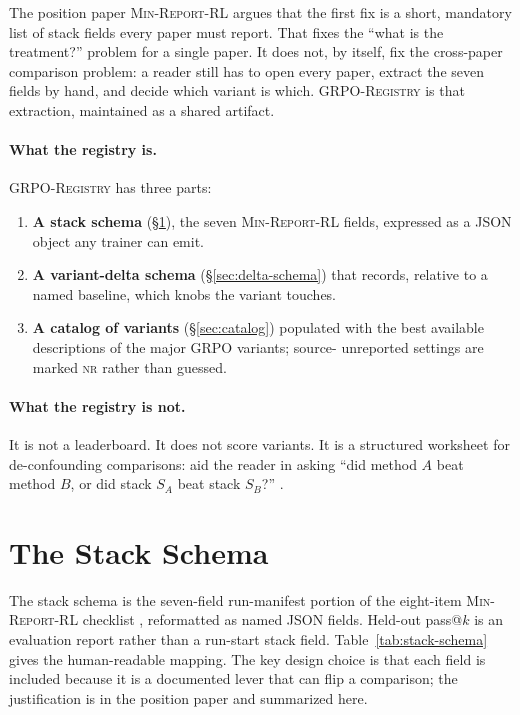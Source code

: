\documentclass[11pt]{article}
\newcommand{\nr}{\textsc{nr}}
\newcommand{\minreport}{\textsc{Min-Report-RL}}
\newcommand{\grpo}{\textsc{GRPO}}
\newcommand{\grpoReg}{\textsc{GRPO-Registry}}
\begin{document}
The position paper \minreport{} \cite{minreportrl2026} argues that the first
fix is a short, mandatory list of stack fields every paper must report. That
fixes the ``what is the treatment?'' problem for a single paper. It does not,
by itself, fix the cross-paper comparison problem: a reader still has to open
every paper, extract the seven fields by hand, and decide which variant is
which. \grpoReg{} is that extraction, maintained as a shared artifact.

\paragraph{What the registry is.} \grpoReg{} has three parts:
\begin{enumerate}[leftmargin=1.6em, itemsep=2pt]
  \item \textbf{A stack schema} (\S\ref{sec:stack-schema}), the seven
    \minreport{} fields, expressed as a JSON object any trainer can emit.
  \item \textbf{A variant-delta schema} (\S\ref{sec:delta-schema}) that
    records, relative to a named baseline, which knobs the variant touches.
  \item \textbf{A catalog of variants} (\S\ref{sec:catalog}) populated with
    the best available descriptions of the major \grpo{} variants; source-
    unreported settings are marked \nr{} rather than guessed.
\end{enumerate}

\paragraph{What the registry is not.} It is not a leaderboard. It does not
score variants. It is a structured worksheet for de-confounding comparisons:
aid the reader in asking ``did method $A$ beat method $B$, or did stack $S_A$
beat stack $S_B$?'' \cite{zvfaudit2026}.

\section{The Stack Schema}
\label{sec:stack-schema}


The stack schema is the seven-field run-manifest portion of the eight-item
\minreport{} checklist \cite{minreportrl2026}, reformatted as named JSON fields.
Held-out pass@$k$ is an evaluation report rather than a run-start stack field.
Table~\ref{tab:stack-schema} gives the
human-readable mapping. The key design choice is that each field is included
because it is a documented lever that can flip a comparison; the justification
is in the position paper and summarized here.
\end{document}
